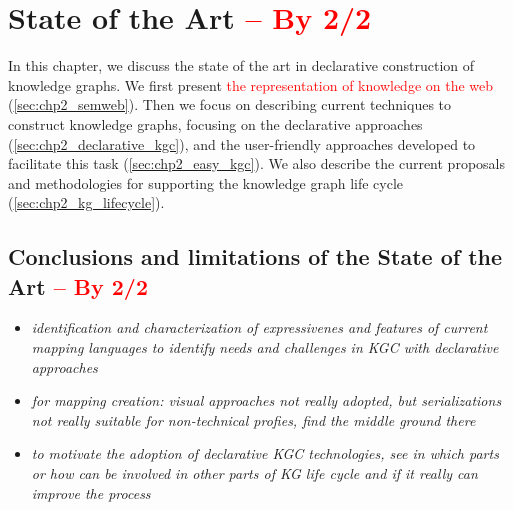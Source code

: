 \chapter{State of the Art \textcolor{red}{-- By 2/2}}
\label{chapter:sota}

In this chapter, we discuss the state of the art in declarative construction of knowledge graphs. We first present \textcolor{red}{the representation of knowledge on the web} (\cref{sec:chp2_semweb}). Then we focus on describing current techniques to construct knowledge graphs, focusing on the declarative approaches (\cref{sec:chp2_declarative_kgc}), and the user-friendly approaches developed to facilitate this task (\cref{sec:chp2_easy_kgc}). We also describe the current proposals and methodologies for supporting the knowledge graph life cycle  (\cref{sec:chp2_kg_lifecycle}).











\section{Conclusions and limitations of the State of the Art \textcolor{red}{-- By 2/2}}


\begin{itemize}
    \item \textit{identification and characterization of expressivenes and features of current mapping languages to identify needs and challenges in KGC with declarative approaches}
    \item \textit{for mapping creation: visual approaches not really adopted, but serializations not really suitable for non-technical profies, find the middle ground there}
    \item \textit{to motivate the adoption of declarative KGC technologies, see in which parts or how can be involved in other parts of KG life cycle and if it really can improve the process}
\end{itemize}